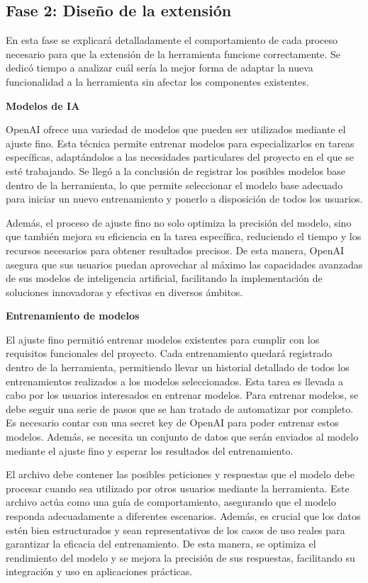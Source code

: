 \subsection{Fase 2: Diseño de la extensión}

En esta fase se explicará detalladamente el comportamiento de cada proceso necesario para que la extensión de la herramienta funcione correctamente. Se dedicó tiempo a analizar cuál sería la mejor forma de adaptar la nueva funcionalidad a la herramienta sin afectar los componentes existentes.

\textbf{Modelos de IA}

OpenAI ofrece una variedad de modelos que pueden ser utilizados mediante el ajuste fino. Esta técnica permite entrenar modelos para especializarlos en tareas específicas, adaptándolos a las necesidades particulares del proyecto en el que se esté trabajando. Se llegó a la conclusión de registrar los posibles modelos base dentro de la herramienta, lo que permite seleccionar el modelo base adecuado para iniciar un nuevo entrenamiento y ponerlo a disposición de todos los usuarios.

Además, el proceso de ajuste fino no solo optimiza la precisión del modelo, sino que también mejora su eficiencia en la tarea específica, reduciendo el tiempo y los recursos necesarios para obtener resultados precisos. De esta manera, OpenAI asegura que sus usuarios puedan aprovechar al máximo las capacidades avanzadas de sus modelos de inteligencia artificial, facilitando la implementación de soluciones innovadoras y efectivas en diversos ámbitos.

\textbf{Entrenamiento de modelos}

El ajuste fino permitió entrenar modelos existentes para cumplir con los requisitos funcionales del proyecto. Cada entrenamiento quedará registrado dentro de la herramienta, permitiendo llevar un historial detallado de todos los entrenamientos realizados a los modelos seleccionados. Esta tarea es llevada a cabo por los usuarios interesados en entrenar modelos. Para entrenar modelos, se debe seguir una serie de pasos que se han tratado de automatizar por completo. Es necesario contar con una secret key de OpenAI para poder entrenar estos modelos. Además, se necesita un conjunto de datos que serán enviados al modelo mediante el ajuste fino y esperar los resultados del entrenamiento.

El archivo debe contener las posibles peticiones y respuestas que el modelo debe procesar cuando sea utilizado por otros usuarios mediante la herramienta. Este archivo actúa como una guía de comportamiento, asegurando que el modelo responda adecuadamente a diferentes escenarios. Además, es crucial que los datos estén bien estructurados y sean representativos de los casos de uso reales para garantizar la eficacia del entrenamiento. De esta manera, se optimiza el rendimiento del modelo y se mejora la precisión de sus respuestas, facilitando su integración y uso en aplicaciones prácticas.


